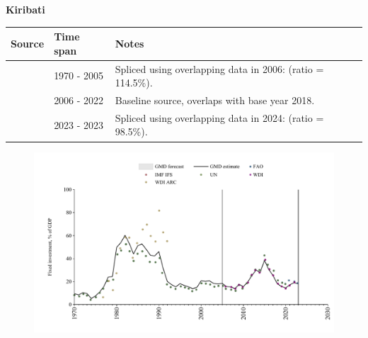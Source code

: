 \documentclass[12pt,a4paper,landscape]{article}
\begin{document}
\begin{adjustbox}{max totalsize={\paperwidth}{\paperheight},center}
\begin{minipage}[t][\textheight][t]{\textwidth}
\vspace*{0.5cm}
{}
\begin{center}
{\Large\bfseries Kiribati}
\end{center}
\vspace{0.5cm}
\begin{table}[H]
\centering
\small
\begin{tabular}{|l|l|l|}
\hline
\textbf{Source} & \textbf{Time span} & \textbf{Notes} \\
\hline
\rowcolor{white}\cite{UN}& 1970 - 2005 &Spliced using overlapping data in 2006: (ratio = 114.5\%).\\
\rowcolor{lightgray}\cite{WDI}& 2006 - 2022 &Baseline source, overlaps with base year 2018.\\
\rowcolor{white}\cite{FAO}& 2023 - 2023 &Spliced using overlapping data in 2024: (ratio = 98.5\%).\\
\hline
\end{tabular}
\end{table}
\begin{figure}[H]
\centering
\includegraphics[width=\textwidth,height=0.6\textheight,keepaspectratio]{graphs/KIR_finv_GDP.pdf}
\end{figure}
\end{minipage}
\end{adjustbox}
\end{document}
